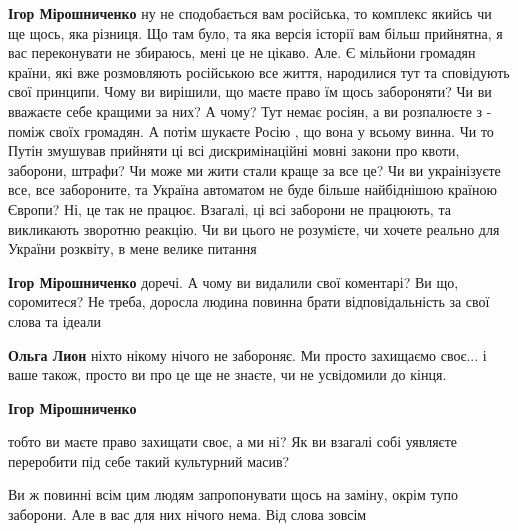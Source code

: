 \begin{itemize}
\begin{itemize}
\textbf{Ігор Мірошниченко} ну не сподобається вам російська, то комплекс якийсь
чи ще щось, яка різниця. Що там було, та яка версія історії вам більш
прийнятна, я вас переконувати не збираюсь, мені це не цікаво. Але. Є мільйони
громадян країни, які вже розмовляють російською все життя, народилися тут та
сповідують свої принципи. Чому ви вирішили, що маєте право їм щось забороняти?
Чи ви вважаєте себе кращими за них? А чому? Тут немає росіян, а ви розпалюєте з
- поміж своїх громадян. А потім шукаєте Росію , що вона у всьому винна. Чи то
Путін змушував прийняти ці всі дискримінаційні мовні закони про квоти,
заборони, штрафи? Чи може ми жити стали краще за все це? Чи ви украінізуєте
все, все забороните, та Україна автоматом не буде більше найбіднішою країною
Європи? Ні, це так не працює. Взагалі, ці всі заборони не працюють, та
викликають зворотню реакцію. Чи ви цього не розумієте, чи хочете реально для
України розквіту, в мене велике питання

 
\textbf{Ігор Мірошниченко} доречі. А чому ви видалили свої коментарі? Ви що,
соромитеся? Не треба, доросла людина повинна брати відповідальність за свої
слова та ідеали

 

\textbf{Ольга Лион} ніхто нікому нічого не забороняє. Ми просто захищаємо
своє... і ваше також, просто ви про це ще не знаєте, чи не усвідомили до кінця.

 
\textbf{Ігор Мірошниченко} 

тобто ви маєте право захищати своє, а ми ні? Як ви взагалі собі уявляєте
переробити під себе такий культурний масив? 

Ви ж повинні всім цим людям запропонувати щось на заміну, окрім тупо заборони.
Але в вас для них нічого нема. Від слова зовсім


\end{itemize}
\end{itemize}
